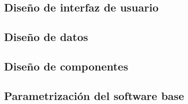 \subsection{Diseño de interfaz de usuario}


\newpage
\subsection{Diseño de datos}
 


\subsection{Diseño de componentes}

\subsection{Parametrización del software base}
